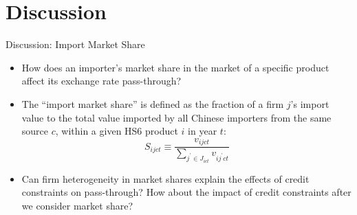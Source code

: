 \documentclass[10pt]{beamer}
\begin{document}
\section{Discussion}

\begin{frame}{Discussion: Import Market Share}
    \begin{itemize}
	\item How does an importer's market share in the market of a specific product affect its exchange rate pass-through?
        \item The ``import market share'' is defined as the fraction of a firm $j$'s import value to the total value imported by all Chinese importers from the same source $c$, within a given HS6 product $i$ in  year $t$:
        $$
        S_{ijct} \equiv \frac{v_{ijct}}{\sum_{j^{\prime} \in J_{ict}} v_{ij^{\prime}ct}}
        $$
        \item Can firm heterogeneity in market shares explain the effects of credit constraints on pass-through? How about the impact of credit constraints after we consider market share?
	\end{itemize}
\end{frame}
\end{document}
